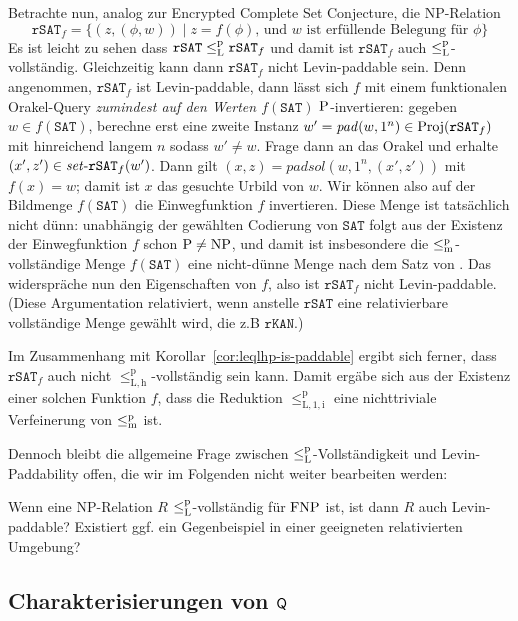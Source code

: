 Betrachte nun, analog zur Encrypted Complete Set Conjecture, die NP-Relation
\[ \mathtt{rSAT}_f = \{ (z, (\phi, w)) \mid \text{$z=f(\phi)$, und $w$ ist erfüllende Belegung für $\phi$} \} \]
Es ist leicht zu sehen dass $\mathtt{rSAT}\leqlp \mathtt{rSAT}_f$ und damit ist $\mathtt{rSAT}_f$ auch $\leqlp$-vollständig.
Gleichzeitig kann dann $\mathtt{rSAT}_f$ nicht Levin-paddable sein.
Denn angenommen, $\mathtt{rSAT}_f$ ist Levin-paddable, dann lässt sich $f$ mit einem funktionalen Orakel-Query \emph{zumindest auf den Werten $f(\mathtt{SAT})$} $\P$-invertieren: gegeben $w\in f(\mathtt{SAT})$, berechne erst eine zweite Instanz $w'=\mathit{pad}(w, 1^n)\in\Proj(\mathtt{rSAT}_f)$ mit hinreichend langem $n$ sodass $w'\neq w$. Frage dann an das Orakel und erhalte $(x',z')\in \fset{}\mathtt{rSAT}_f(w')$.
Dann gilt $(x,z) = \mathit{padsol}(w, 1^n, (x',z'))$ mit $f(x)=w$; damit ist $x$ das gesuchte Urbild von $w$.
Wir können also auf der Bildmenge  $f(\mathtt{SAT})$ die Einwegfunktion $f$ invertieren.
Diese Menge ist tatsächlich nicht dünn: unabhängig der gewählten Codierung von $\mathtt{SAT}$ folgt aus der Existenz der Einwegfunktion $f$ schon $\P\neq\NP$, und damit ist insbesondere die $\leqmp$-vollständige Menge $f(\mathtt{SAT})$ eine nicht-dünne Menge nach dem Satz von \textcite{mahaney_sparse_1982}.
Das widerspräche nun den Eigenschaften von $f$, also ist $\mathtt{rSAT}_f$ nicht Levin-paddable.
(Diese Argumentation relativiert, wenn anstelle $\mathtt{rSAT}$ eine relativierbare vollständige Menge gewählt wird, die z.B $\mathtt{rKAN}$.)

Im Zusammenhang mit Korollar~\ref{cor:leqlhp-is-paddable} ergibt sich ferner, dass $\mathtt{rSAT}_f$ auch nicht $\leq_\mathrm{L,h}^\mathrm p$-vollständig sein kann. Damit ergäbe sich aus der Existenz einer solchen Funktion $f$, dass die Reduktion $\leq_\mathrm{L,1,i}^\mathrm p$ eine nichttriviale Verfeinerung von $\leqmp$ ist.

Dennoch bleibt die allgemeine Frage zwischen $\leqlp$-Vollständigkeit und Levin-Paddability offen, die wir im Folgenden nicht weiter bearbeiten werden:
\begin{question}\label{question:levin-paddable}
    Wenn eine NP-Relation $R$ $\leqlp$-vollständig für $\FNP$ ist, ist dann $R$ auch Levin-paddable?
    Existiert ggf. ein Gegenbeispiel in einer geeigneten relativierten Umgebung?
\end{question}

\subsection*{Charakterisierungen von $\hQ$}

